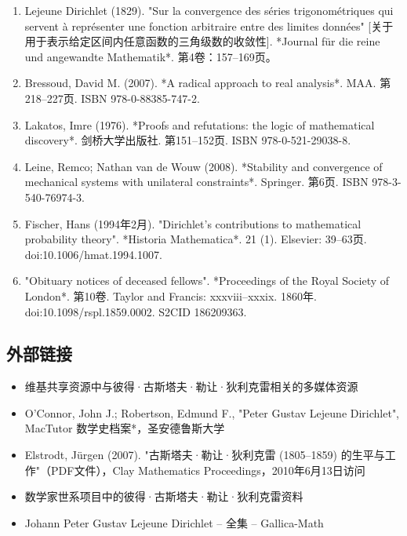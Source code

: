 \begin{enumerate}
\item Lejeune Dirichlet (1829). "Sur la convergence des séries trigonométriques qui servent à représenter une fonction arbitraire entre des limites données" [关于用于表示给定区间内任意函数的三角级数的收敛性]. *Journal für die reine und angewandte Mathematik*. 第4卷：157–169页。
\item Bressoud, David M. (2007). *A radical approach to real analysis*. MAA. 第218–227页. ISBN 978-0-88385-747-2.
\item Lakatos, Imre (1976). *Proofs and refutations: the logic of mathematical discovery*. 剑桥大学出版社. 第151–152页. ISBN 978-0-521-29038-8.
\item Leine, Remco; Nathan van de Wouw (2008). *Stability and convergence of mechanical systems with unilateral constraints*. Springer. 第6页. ISBN 978-3-540-76974-3.
\item Fischer, Hans (1994年2月). "Dirichlet's contributions to mathematical probability theory". *Historia Mathematica*. 21 (1). Elsevier: 39–63页. doi:10.1006/hmat.1994.1007.
\item "Obituary notices of deceased fellows". *Proceedings of the Royal Society of London*. 第10卷. Taylor and Francis: xxxviii–xxxix. 1860年. doi:10.1098/rspl.1859.0002. S2CID 186209363.
\end{enumerate}
\subsection{外部链接}
\begin{itemize}
\item 维基共享资源中与彼得·古斯塔夫·勒让·狄利克雷相关的多媒体资源
\item O'Connor, John J.; Robertson, Edmund F., "Peter Gustav Lejeune Dirichlet", MacTutor 数学史档案*，圣安德鲁斯大学
\item Elstrodt, Jürgen (2007). "古斯塔夫·勒让·狄利克雷 (1805–1859) 的生平与工作"（PDF文件），Clay Mathematics Proceedings，2010年6月13日访问
\item 数学家世系项目中的彼得·古斯塔夫·勒让·狄利克雷资料
\item Johann Peter Gustav Lejeune Dirichlet – 全集 – Gallica-Math
\end{itemize}

